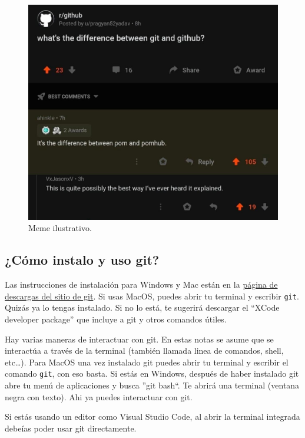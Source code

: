 \documentclass[spanish, 12pt, a4paper]{article}
\begin{document}
\begin{figure}
\centering
\includegraphics{figs/meme_git_v_gh.jpg}
\caption{Meme ilustrativo.{}}
\end{figure}

\subsection{¿Cómo instalo y uso git?}

Las instrucciones de instalación para Windows y Mac están en la
\href{https://git-scm.com/downloads}{página de descargas del sitio de
git}. Si usas MacOS, puedes abrir tu terminal y escribir
\passthrough{\lstinline!git!}. Quizás ya lo tengas instalado. Si no lo
está, te sugerirá descargar el ``XCode developer package'' que incluye a
git y otros comandos útiles.

Hay varias maneras de interactuar con git. En estas notas se asume que
se interactúa a través de la terminal (también llamada linea de
comandos, shell, etc\ldots). Para MacOS una vez instalado git puedes
abrir tu terminal y escribir el comando \passthrough{\lstinline!git!},
con eso basta. Si estás en Windows, después de haber instalado git abre
tu menú de aplicaciones y busca ''git bash``. Te abrirá una terminal
(ventana negra con texto). Ahi ya puedes interactuar con git.

Si estás usando un editor como Visual Studio Code, al abrir la terminal
integrada debeías poder usar git directamente.
\end{document}
